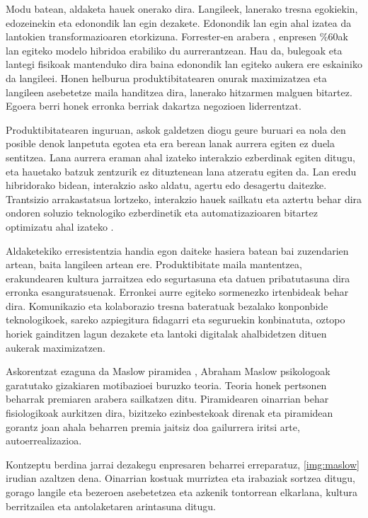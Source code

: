 Modu batean, aldaketa hauek onerako dira. Langileek, lanerako tresna egokiekin, edozeinekin eta edonondik lan egin dezakete. Edonondik lan egin ahal izatea da lantokien transformazioaren etorkizuna. Forrester-en arabera \cite{forrester-anywhere-work-strategy}, enpresen \%60ak lan egiteko modelo hibridoa erabiliko du aurrerantzean. Hau da, bulegoak eta lantegi fisikoak mantenduko dira baina edonondik lan egiteko aukera ere eskainiko da langileei. Honen helburua produktibitatearen onurak maximizatzea eta langileen asebetetze maila handitzea dira, lanerako hitzarmen malguen bitartez. Egoera berri honek erronka berriak dakartza negozioen liderrentzat.

Produktibitatearen inguruan, askok galdetzen diogu geure buruari ea nola den posible denok lanpetuta egotea eta era berean lanak aurrera egiten ez duela sentitzea. Lana aurrera eraman ahal izateko interakzio ezberdinak egiten ditugu, eta hauetako batzuk zentzurik ez dituztenean lana atzeratu egiten da. Lan eredu hibridorako bidean, interakzio asko aldatu, agertu edo desagertu daitezke. Trantsizio arrakastatsua lortzeko, interakzio hauek sailkatu eta aztertu behar dira ondoren soluzio teknologiko ezberdinetik eta automatizazioaren bitartez optimizatu ahal izateko \cite{mckinsey-interactions}.

Aldaketekiko erresistentzia handia egon daiteke hasiera batean bai zuzendarien artean, baita langileen artean ere. Produktibitate maila mantentzea, erakundearen kultura jarraitzea edo segurtasuna eta datuen pribatutasuna dira erronka esanguratsuenak. Erronkei aurre egiteko sormenezko irtenbideak behar dira. Komunikazio eta kolaborazio tresna bateratuak bezalako konponbide teknologikoek, sareko azpiegitura fidagarri eta seguruekin konbinatuta, oztopo horiek gainditzen lagun dezakete eta lantoki digitalak ahalbidetzen dituen aukerak maximizatzen.

Askorentzat ezaguna da Maslow piramidea \cite{wiki-maslow}, Abraham Maslow psikologoak garatutako gizakiaren motibazioei buruzko teoria. Teoria honek pertsonen beharrak premiaren arabera sailkatzen ditu. Piramidearen oinarrian behar fisiologikoak aurkitzen dira, bizitzeko ezinbestekoak direnak eta piramidean gorantz joan ahala beharren premia jaitsiz doa gailurrera iritsi arte, autoerrealizazioa.

Kontzeptu berdina jarrai dezakegu enpresaren beharrei erreparatuz, \ref{img:maslow} irudian azaltzen dena. Oinarrian kostuak murriztea eta irabaziak sortzea ditugu, gorago langile eta bezeroen asebetetzea eta azkenik tontorrean elkarlana, kultura berritzailea eta antolaketaren arintasuna ditugu.


